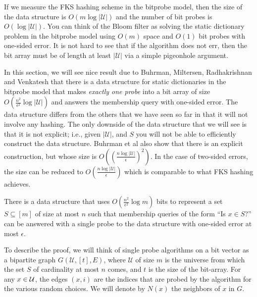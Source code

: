 If we measure the FKS hashing scheme in the bitprobe model, then the size of the
data structure is $O(m\log |\mathcal{U}|)$ and the number of bit probes is
$O(\log |\mathcal{U}|)$. You can think of the Bloom filter as solving the static
dictionary problem in the bitprobe model using $O(m)$ space and $O(1)$ bit
probes with one-sided error. It is not hard to see that if the algorithm does
not err, then the bit array must be of length at least $|\mathcal{U}|$ via a
simple pigeonhole argument.

In this section, we will see nice result due to Buhrman, Miltersen,
Radhakrishnan and Venkatesh that there is a data structure for static
dictionaries in the bitprobe model that makes \emph{exactly one probe} into a
bit array of size $O\left(\tfrac{n^2}{\epsilon^2}\log |\mathcal{U}|\right)$ and
answers the membership query with one-sided error. The data structure differs
from the others that we have seen so far in that it will not involve any
hashing. The only downside of the data structure that we will see is that it is
not explicit; i.e., given $|\mathcal{U}|$, and $S$ you will not be able to
efficiently construct the data structure. Buhrman et al also show that there is
an explicit construction, but whose size is
$O\left(\left(\frac{n\log |\mathcal{U}|}{\epsilon} \right)^2 \right)$. In the
case of two-sided errors, the size can be reduced to
$O\left( \frac{n\log |\mathcal{U}|}{\epsilon} \right)$ which is comparable to
what FKS hashing achieves.

\begin{theorem}
  There is a data structure that uses
  $O\left(\frac{n^2}{\epsilon^2}\log m \right)$ bits to represent a set
  $S \subseteq [m]$ of size at most $n$ such that membership queries of the form
  ``Is $x\in S$?''  can be answered with a single probe to the data structure with
  one-sided error at most $\epsilon$.
  \label{thm:bitprobe-1-query}
\end{theorem}

To describe the proof, we will think of single probe algorithms on a bit vector
as a bipartite graph $G(\mathcal{U}, [t], E)$, where $\mathcal{U}$ of size $m$
is the universe from which the set $S$ of cardinality at most $n$ comes, and $t$
is the size of the bit-array. For any $x\in {\cal U}$, the edges $(x,i)$ are the
indices that are probed by the algorithm for the various random choices. We will denote by $N(x)$ the neighbors of $x$ in $G$.

